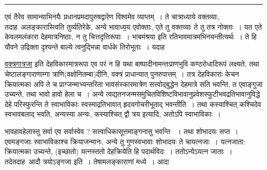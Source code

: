 \documentclass[11pt, openany]{book}
\begin{document}

\newpage
\lfoot{}

\begin{quote}
 {}
\end{quote}

\hrule

\vspace{2mm}

एवं तैरेव सामान्याभिनयैः प्रधानप्रमदापुरुषद्वारेण विश्वमेव व्याप्तम्~। ते चात्राध्याये वक्तव्याः, तदाह\textendash\ अलङ्कारास्त्विति तुर्व्यतिरेके, अन्ये भावाध्य॒य एवोक्ताः, एते तु वक्तव्याः ते तु तत्र नोक्ताः~। यत एते केवलमलंकारा देहमात्रनिष्ठाः, न तु चित्तदृत्तिरूपाः~। भाबमंश्रया इति रतिभावमात्रमभिनयन्तीत्यर्थः~। ते हि यौवने उद्रिक्ता दृश्यन्ते बाल्ये त्वनुद्भिन्ना वार्धके तिरोभूताः~। यदाह\textendash\ 

\begin{quote}
 { }
\end{quote}

\begin{sloppypar}
\underline{वक्त्रगात्रजा} इति देहविकारमात्ररूपा एव परं न हि यथा बाष्पादीनामन्तःप्राणभुवि कण्ठरोधादिरूपं लक्ष्यते, तथा चेष्टालङ्गाराणाम्गा त्राणि(वक्षोनितम्बा)दीनि, वक्त्रं प्राधान्यात् पुनरुपात्तम्~। तत्र देहविकाराः केचन क्रियात्मका अपि ते च प्राग्जन्माभ्यन्तरिता भावसंस्कारमात्रेण सत्त्वोद्बुद्धेन देहमात्रे सति भवन्ति, त एवाङ्गुजा उच्यन्ते, तथा भावो हावो हेला च~। अन्ये त्वद्यतनजन्मसमुचितविशिष्टविभावानुप्रवेशस्फुटीभवद्रतिभावानुविद्धे देहे परिस्फुरन्ति ते स्वाभाविकाः स्वस्माद्रतिभावात् हृदयगोचरीभूताद् भवन्तीति~। तथा कस्याश्चित् कश्चिदेव स्वभावबलाद् भवति, अन्यस्या अन्यः, कस्याश्चित् द्वौ त्रय इत्यादि, अतोऽपि स्वाभाविकाः~। \\
\end{sloppypar}

भावहावहेलास्तु सर्वा एव सर्वास्वेव ? सत्त्वाधिकासूत्तमाङ्गनासु भवन्ति ~। तथा शोभादयः सप्त~। एवमङ्गजाः स्वाभाविकाश्च क्रियाजन्मानः, अन्ये तु गुणस्वभावाः शोभादयः ते चायत्नजाः~। यत्नजाता: क्रियात्मका उच्यन्ते, (इच्छातो) यत्नस्ततो देहक्रियेति हि पदार्थविदः~। ततोऽन्येऽयत्न जाताः~। तदेतदाह\textendash\ आदौ त्रयोऽङ्गजा इति~। तेषामलङ्काराणां मध्ये~। आदा\textendash\ 
\end{document}
